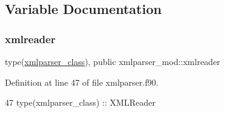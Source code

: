 \subsection{Variable Documentation}
\mbox{\label{namespacexmlparser__mod_a482bd93d0a4ba8c9c2000713a4b14799}} 
\subsubsection{\texorpdfstring{xmlreader}{xmlreader}}
{\footnotesize\ttfamily type(\mbox{\hyperlink{structxmlparser__mod_1_1xmlparser__class}{xmlparser\+\_\+class}}), public xmlparser\+\_\+mod\+::xmlreader}



Definition at line 47 of file xmlparser.\+f90.


\begin{DoxyCode}
47     \textcolor{keywordtype}{type}(xmlparser\_class) :: XMLReader
\end{DoxyCode}

